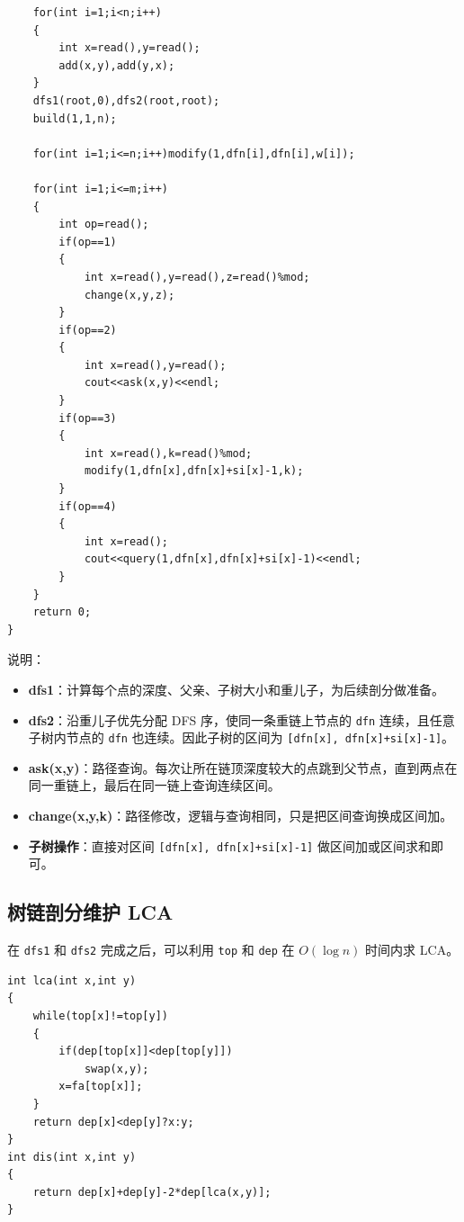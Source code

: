 \begin{verbatim}
    for(int i=1;i<n;i++)
    {
        int x=read(),y=read();
        add(x,y),add(y,x);
    }
    dfs1(root,0),dfs2(root,root);
    build(1,1,n);
    
    for(int i=1;i<=n;i++)modify(1,dfn[i],dfn[i],w[i]);
    
    for(int i=1;i<=m;i++)
    {
        int op=read();
        if(op==1)
        {
            int x=read(),y=read(),z=read()%mod;
            change(x,y,z);
        }
        if(op==2)
        {
            int x=read(),y=read();
            cout<<ask(x,y)<<endl;
        }
        if(op==3)
        {
            int x=read(),k=read()%mod;
            modify(1,dfn[x],dfn[x]+si[x]-1,k);
        }
        if(op==4)
        {
            int x=read();
            cout<<query(1,dfn[x],dfn[x]+si[x]-1)<<endl;
        }
    }
    return 0;
}
\end{verbatim}

\par \noindent 说明：
\begin{itemize}
\item \textbf{dfs1}：计算每个点的深度、父亲、子树大小和重儿子，为后续剖分做准备。
\item \textbf{dfs2}：沿重儿子优先分配 DFS 序，使同一条重链上节点的 \texttt{dfn} 连续，且任意子树内节点的 \texttt{dfn} 也连续。因此子树的区间为 \texttt{[dfn[x], dfn[x]+si[x]-1]}。
\item \textbf{ask(x,y)}：路径查询。每次让所在链顶深度较大的点跳到父节点，直到两点在同一重链上，最后在同一链上查询连续区间。
\item \textbf{change(x,y,k)}：路径修改，逻辑与查询相同，只是把区间查询换成区间加。
\item \textbf{子树操作}：直接对区间 \texttt{[dfn[x], dfn[x]+si[x]-1]} 做区间加或区间求和即可。
\end{itemize}

\subsection{树链剖分维护 LCA}

\par \noindent 在 \texttt{dfs1} 和 \texttt{dfs2} 完成之后，可以利用 \texttt{top} 和 \texttt{dep} 在 $O(\log n)$ 时间内求 LCA。

\begin{verbatim}
int lca(int x,int y)
{
    while(top[x]!=top[y])
    {
        if(dep[top[x]]<dep[top[y]])
            swap(x,y);
        x=fa[top[x]];
    }
    return dep[x]<dep[y]?x:y;
}
int dis(int x,int y)
{
    return dep[x]+dep[y]-2*dep[lca(x,y)];
}
\end{verbatim}


